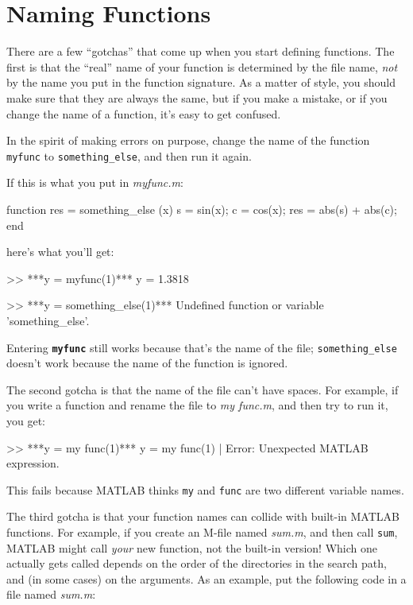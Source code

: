 
\section{Naming Functions}

There are a few ``gotchas'' that come up when you start defining functions.
The first is that the ``real'' name of your function is determined by the file name, {\em not} by the name you put in the function signature.  As a matter of style, you
should make sure that they are always the same, but if you
make a mistake, or if you change the name of a function, it's
easy to get confused.


In the spirit of making errors on purpose, change the name of
the function \lstinline{myfunc} to \lstinline{something_else}, and
then run it again.

If this is what you put in \emph{myfunc.m}:

\begin{code}
function res = something_else (x)
    s = sin(x);
    c = cos(x);
    res = abs(s) + abs(c);
end
\end{code}
here's what you'll get:

\begin{code}
>> ***y = myfunc(1)***
y = 1.3818

>> ***y = something_else(1)***
Undefined function or variable 'something_else'.
\end{code}

Entering \textbf{\lstinline{myfunc}} still works because that's the name of the file;
\lstinline{something_else} doesn't work because the name of the function is ignored.

The second gotcha is that the name of the file can't have spaces.
For example, if you write a function and rename the file to 
{\em my func.m},
and then try to run it, you get:

\begin{code}
>> ***y = my func(1)***
 y = my func(1)
        |
Error: Unexpected MATLAB expression.
\end{code}
This fails because MATLAB thinks \lstinline{my} and \lstinline{func} are two different
variable names.

The third gotcha is that your function names can collide with built-in
MATLAB functions.  For example, if you create an M-file named {\em sum.m}, and then call \lstinline{sum}, MATLAB might call {\em your} new
function, not the built-in version!  Which one actually gets called
depends on the order of the directories in the search path, and
(in some cases) on the arguments.  As an example, put the following
code in a file named {\em sum.m}:


